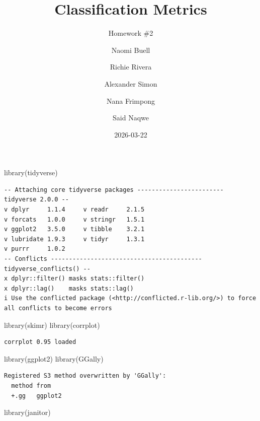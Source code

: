 \documentclass[
  11pt]{article}
\title{Classification Metrics}
\subtitle{Homework \#2}
\author{Naomi Buell \and Richie Rivera \and Alexander Simon \and Nana
Frimpong \and Said Naqwe}
\date{2026-03-22}
\newenvironment{Shaded}{\begin{snugshade}}{\end{snugshade}}
\newcommand{\FunctionTok}[1]{\textcolor[rgb]{0.28,0.35,0.67}{#1}}
\newcommand{\NormalTok}[1]{\textcolor[rgb]{0.00,0.23,0.31}{#1}}
\begin{document}
\maketitle


\begin{Shaded}
\begin{Highlighting}[]
\FunctionTok{library}\NormalTok{(tidyverse)}
\end{Highlighting}
\end{Shaded}

\begin{verbatim}
-- Attaching core tidyverse packages ------------------------ tidyverse 2.0.0 --
v dplyr     1.1.4     v readr     2.1.5
v forcats   1.0.0     v stringr   1.5.1
v ggplot2   3.5.0     v tibble    3.2.1
v lubridate 1.9.3     v tidyr     1.3.1
v purrr     1.0.2     
-- Conflicts ------------------------------------------ tidyverse_conflicts() --
x dplyr::filter() masks stats::filter()
x dplyr::lag()    masks stats::lag()
i Use the conflicted package (<http://conflicted.r-lib.org/>) to force all conflicts to become errors
\end{verbatim}

\begin{Shaded}
\begin{Highlighting}[]
\FunctionTok{library}\NormalTok{(skimr)}
\FunctionTok{library}\NormalTok{(corrplot)}
\end{Highlighting}
\end{Shaded}

\begin{verbatim}
corrplot 0.95 loaded
\end{verbatim}

\begin{Shaded}
\begin{Highlighting}[]
\FunctionTok{library}\NormalTok{(ggplot2)}
\FunctionTok{library}\NormalTok{(GGally)}
\end{Highlighting}
\end{Shaded}

\begin{verbatim}
Registered S3 method overwritten by 'GGally':
  method from   
  +.gg   ggplot2
\end{verbatim}

\begin{Shaded}
\begin{Highlighting}[]
\FunctionTok{library}\NormalTok{(janitor)}
\end{Highlighting}
\end{Shaded}
\end{document}
